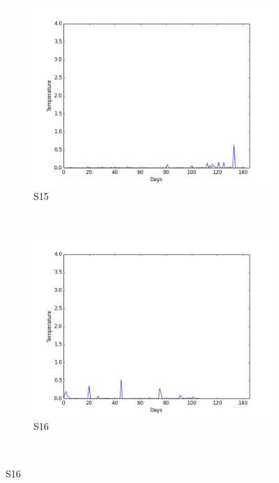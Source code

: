 \documentclass[12pt]{article} %
\begin{document}
\begin{figure}[H]
    \begin{subfigure}[b]{0.30\textwidth}
        \includegraphics[width=\textwidth]{img/graphs/15-gsr-1}
        \caption{S15}
        \label{fig:s15GSR}
    \end{subfigure}
    ~ %
    \begin{subfigure}[b]{0.30\textwidth}
        \includegraphics[width=\textwidth]{img/graphs/16-gsr-1}
        \caption{S16}
        \label{fig:s16GSR}
    \end{subfigure}
    ~ %

\end{figure}
\end{document}
